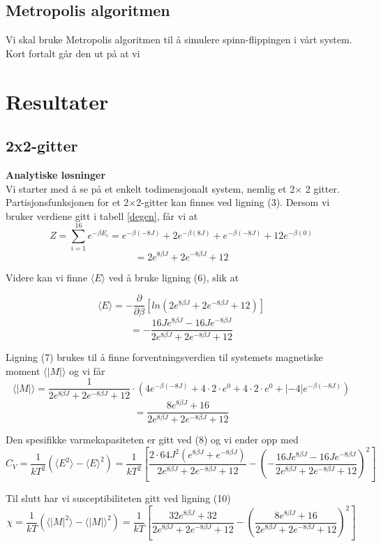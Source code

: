 \documentclass[11pt,a4paper]{article}
\begin{document}
\subsection{Metropolis algoritmen}
Vi skal bruke Metropolis algoritmen til å simulere spinn-flippingen i vårt system. Kort fortalt går den ut på at vi


\section{Resultater}
\subsection{2x2-gitter}
\textbf{Analytiske løsninger}\\
Vi starter med å se på et enkelt todimensjonalt system, nemlig et 2$\times$ 2 gitter. Partisjonsfunksjonen for et 2$\times$2-gitter kan finnes ved ligning (3). Dersom vi bruker verdiene gitt i tabell \ref{degen}, får vi at 
\[ Z = \sum_{i=1}^{16} e^{-\beta E_i} = e^{-\beta(-8J)} + 2e^{-\beta(8J)} + e^{- \beta(-8J)} + 12e^{-\beta(0)} \]
\[ = 2e^{8\beta J} + 2e^{-8 \beta J} + 12  \]

Videre kan vi finne $\langle E \rangle$ ved å bruke ligning (6), slik at 

\[\langle E \rangle = - \frac{\partial}{\partial \beta} \left[ ln(2e^{8\beta J} + 2e^{-8 \beta J} + 12) \right] \]
\[ = - \frac{16Je^{8\beta J} - 16Je^{-8\beta J}}{2e^{8\beta J} + 2e^{-8 \beta J} + 12 } \]

Ligning (7) brukes til å finne forventningsverdien til systemets magnetiske moment $\langle |M| \rangle$ og vi får
\[ \langle |M| \rangle  = \frac{1}{2e^{8\beta J} + 2e^{-8 \beta J} + 12} \cdot (4e^{-\beta(-8J)} + 4\cdot 2 \cdot e^0 + 4\cdot 2 \cdot e^0 + | - 4|e^{-\beta(-8J)} )\]
\[ = \frac{8e^{8\beta J} + 16}{2e^{8\beta J} + 2e^{-8 \beta J} + 12} \]

Den spesifikke varmekapasiteten er gitt ved (8) og vi ender opp med
\[C_V = \frac{1}{kT^2}\left(\langle E^2 \rangle - \langle E \rangle^2 \right) = \frac{1}{kT^2}\left[ \frac{2\cdot 64J^2 (e^{8\beta J} + e^{-8\beta J})}{2e^{8\beta J} + 2e^{-8 \beta J} + 12} - \left( - \frac{16Je^{8\beta J} - 16Je^{-8\beta J}}{2e^{8\beta J} + 2e^{-8 \beta J} + 12 } \right)^2 \right]  \]

Til slutt har vi susceptibiliteten gitt ved ligning (10)
\[ \chi = \frac{1}{kT} (\langle |M|^2 \rangle - \langle |M| \rangle ^2 ) = \frac{1}{kT} \left[ \frac{32e^{8\beta J} + 32}{2e^{8\beta J} + 2e^{-8 \beta J} + 12 } - \left( \frac{8e^{8\beta J} + 16}{2e^{8\beta J} + 2e^{-8 \beta J} + 12 } \right)^2 \right]  \]
\end{document}
